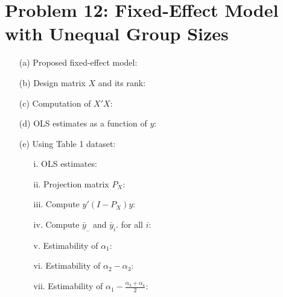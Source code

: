 \documentclass[10pt, oneside]{article}
\begin{document}
\section*{Problem 12: Fixed-Effect Model with Unequal Group Sizes}
\begin{itemize}
	\item[(a)] Proposed fixed-effect model:
	\item[(b)] Design matrix $X$ and its rank:
	\item[(c)] Computation of $X'X$:
	\item[(d)] OLS estimates as a function of $y$:
	\item[(e)] Using Table 1 dataset:
	\begin{itemize}
		\item[i.] OLS estimates:
		\item[ii.] Projection matrix $P_X$:
		\item[iii.] Compute $y'(I - P_X)y$:
		\item[iv.] Compute $\bar{y}_{..}$ and $\bar{y}_i.$ for all $i$:
		\item[v.] Estimability of $\alpha_1$:
		\item[vi.] Estimability of $\alpha_2 - \alpha_3$:
		\item[vii.] Estimability of $\alpha_1 - \frac{\alpha_3 + \alpha_4}{2}$:
	\end{itemize}
\end{itemize}
\end{document}
